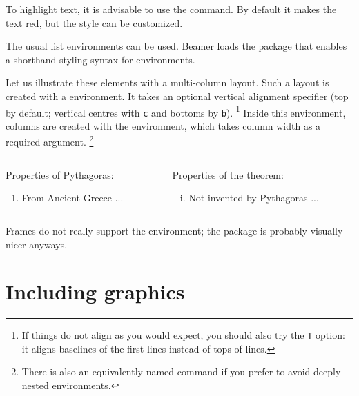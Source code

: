 To highlight text, it is advisable to use the  command.
By default it makes the text red, but the style can be customized.

The usual list environments can be used.
Beamer loads the  package that enables a shorthand styling syntax
for  environments.

Let us illustrate these elements with a multi-column layout.
Such a layout is created with a  environment.
It takes an optional vertical alignment specifier (top by default;
vertical centres with \verb|c| and bottoms by \verb|b|).%
\footnote{If things do not align as you would expect,
you should also try the \texttt{T} option:
it aligns baselines of the first lines instead of tops of lines.}
%
Inside this environment, columns are created with the  environment,
which takes column width as a required argument.%
\footnote{There is also an equivalently named command
if you prefer to avoid deeply nested environments.}
%
\begin{ExampleCode}
\begin{columns}
\begin{column}{0.5\textwidth}

Properties of \alert{Pythagoras}:
\begin{enumerate}[1.]
    \item From Ancient Greece ...
\end{enumerate}
\end{column}

\begin{column}{0.5\textwidth}
Properties of \alert{the theorem}:
\begin{enumerate}[i)]
    \item Not invented by Pythagoras ...
\end{enumerate}

\end{column}
\end{columns}
\end{ExampleCode}
%


\begin{gotcha}
Frames do not really support the  environment;
the  package is probably visually nicer anyways.
\end{gotcha}


%
%
\section{Including graphics}

